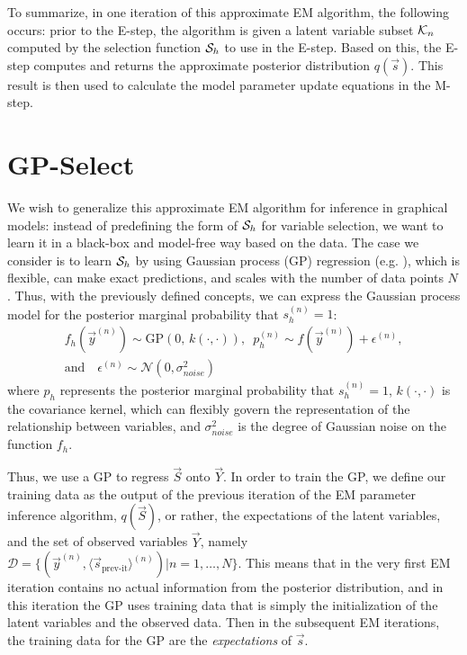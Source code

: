 To summarize, in one iteration of this approximate EM algorithm, the following
occurs: prior to the E-step, the algorithm is given a latent variable subset
$\mathcal{K}_{n}$ computed by the selection function $\mathcal{S}_{h}$ to use in the E-step.  Based on
this, the E-step computes and returns the approximate posterior distribution
$q(\vec{s})$.  This result is then used to calculate the model parameter update
equations in the M-step.


\section{GP-Select}
%
We wish to generalize this approximate EM algorithm for inference in graphical
models: instead of predefining the form of $\mathcal{S}_{h}$ for variable selection, we want
to learn it in a black-box and model-free way based on the data.
%
The case we consider is to learn $\mathcal{S}_{h}$ by using Gaussian process (GP) regression
(e.g. \citep{RasmussenGPbook}), which is flexible, can make exact predictions,
and scales with the number of data points $N$.  Thus, with the previously
defined concepts, we can express the Gaussian process model for the posterior
marginal probability that $s_h^{(n)}=1$:
%
\begin{align}\label{eq:gen-story}
f_h(\vec{y}^{(n)}) \sim \text{GP}\left(0, \, k(\cdot,\cdot) \right), \,\,\,
p_h^{(n)} \sim f(\vec{y}^{(n)}) + \epsilon^{(n)}, \\
\text{and}\quad \epsilon^{(n)} \sim \mathcal{N}(0,\sigma^2_{noise})
\end{align}
%
where $p_h$ represents the posterior marginal probability that $s_h^{(n)}=1$,
$k(\cdot, \cdot)$ is the covariance kernel, which can flexibly govern the
representation of the relationship between variables, and $\sigma_{noise}^2$ is
the degree of Gaussian noise on the function $f_h$.

Thus, we use a GP to regress $\vec{S}$ onto $\vec{Y}$.  In order to train the
GP, we define our training data as the output of the previous iteration of the
EM parameter inference algorithm, $q(\vec{S})$, or rather, the expectations of
the latent variables, and the set of observed variables $\vec{Y}$, namely 
$\mathcal{D} = \{ (\vec{y}^{(n)}, \langle\vec{s}_{\text{prev-it}}\rangle^{(n)}) | n = 1,
\dots, N \}$.  
This means that in the very first EM iteration contains no actual
information from the posterior distribution, and in this iteration the GP uses
training data that is simply the initialization of the latent variables and the
observed data.
Then in the subsequent EM iterations, the training data for the GP are the \textit{expectations} of $\vec{s}$.


